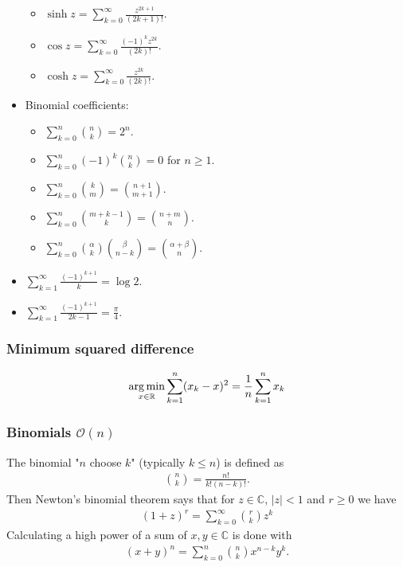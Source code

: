 \begin{itemize}
\begin{itemize}
        \item $\sinh z = \sum_{k=0}^\infty \frac{z^{2k + 1}}{(2k + 1)!}$.
        \item $\cos z = \sum_{k=0}^\infty \frac{(-1)^k z^{2k}}{(2k)!}$.
        \item $\cosh z = \sum_{k=0}^\infty \frac{z^{2k}}{(2k)!}$.
    \end{itemize}
    \item Binomial coefficients:
    \begin{itemize}
        \item $\sum_{k=0}^n \binom nk = 2^n$.
        \item $\sum_{k=0}^n (-1)^k \binom nk = 0$ for $n \geq 1$.
        \item $\sum_{k=0}^n \binom km = \binom{n+1}{m+1}$.
        \item $\sum_{k=0}^n \binom{m + k - 1}{k} = \binom{n + m}{n}$.
        \item $\sum_{k=0}^n \binom\alpha k \binom\beta{n - k} = \binom{\alpha + \beta}{n}$.
    \end{itemize}
    \item $\sum_{k=1}^\infty \frac{(-1)^{k+1}}k = \log2$.
    \item $\sum_{k=1}^\infty \frac{(-1)^{k+1}}{2k - 1} = \frac\pi4$.
\end{itemize}

\subsubsection{Minimum squared difference}
\begin{align*}
    \operatorname*{arg\,min}_{x \in \mathbb R} \sum_{k=1}^n (x_k - x)^2 = \frac1n\sum_{k=1}^n x_k
\end{align*}

\subsubsection{Binomials $\mathcal O(n)$}
The binomial "$n$ choose $k$" (typically $k \leq n$) is defined as
\begin{align*}
    \binom nk = \frac{n!}{k!(n - k)!}.
\end{align*}
Then Newton's binomial theorem says that for $z \in \mathbb C$, $|z| < 1$ and $r \geq 0$ we have
\begin{align*}
    (1 + z)^r = \sum_{k=0}^\infty \binom rk z^k
\end{align*}
Calculating a high power of a sum of $x, y \in \mathbb C$ is done with
\begin{align*}
    (x + y)^n = \sum_{k=0}^n \binom nk x^{n-k}y^k.
\end{align*}



